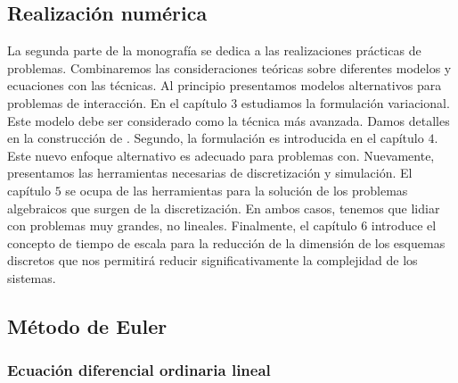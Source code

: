 \begin{partbacktext}
\part{Realización numérica}
La segunda parte de la monografía se dedica a las realizaciones prácticas de problemas. Combinaremos las consideraciones teóricas sobre diferentes modelos y ecuaciones con las técnicas. Al principio presentamos modelos alternativos para problemas de interacción. En el capítulo $3$ estudiamos la formulación variacional. Este modelo debe ser considerado como la técnica más avanzada. Damos detalles en la construcción de . Segundo, la formulación es introducida en el capítulo $4$. Este nuevo enfoque alternativo es adecuado para problemas con. Nuevamente, presentamos las herramientas necesarias de discretización y simulación. El capítulo $5$ se ocupa de las herramientas para la solución de los problemas algebraicos que surgen de la discretización. En ambos casos, tenemos que lidiar con problemas muy grandes, no lineales. Finalmente, el capítulo $6$ introduce el concepto de tiempo de escala para la reducción de la dimensión de los esquemas discretos que nos permitirá reducir significativamente la complejidad de los sistemas.
\end{partbacktext}
\chapter{Método de Euler}
\section{Ecuación diferencial ordinaria lineal}